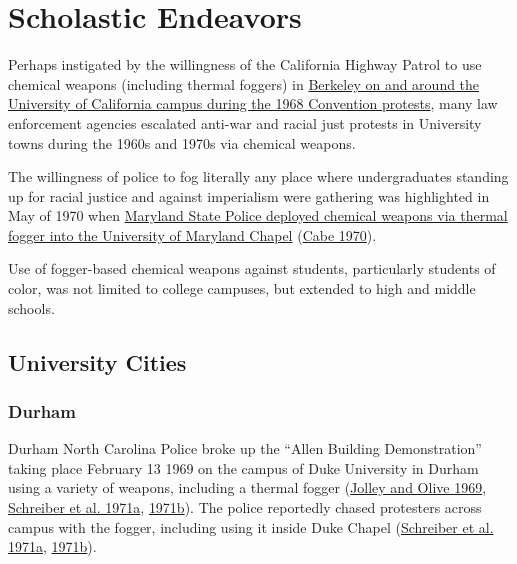 \documentclass[
  11pt,
]{krantz}
\begin{document}
\hypertarget{scholastic-endeavors}{%
\chapter{Scholastic Endeavors}\label{scholastic-endeavors}}

Perhaps instigated by the willingness of the California Highway Patrol to use chemical weapons (including thermal foggers) in \protect\hyperlink{BerkeleyCA1968_08_31}{Berkeley on and around the University of California campus during the 1968 Convention protests}, many law enforcement agencies escalated anti-war and racial just protests in University towns during the 1960s and 1970s via chemical weapons.

The willingness of police to fog literally any place where undergraduates standing up for racial justice and against imperialism were gathering was highlighted in May of 1970 when \protect\hyperlink{CollegeParkMD1970_05_04}{Maryland State Police deployed chemical weapons via thermal fogger into the University of Maryland Chapel} (\protect\hyperlink{ref-Cabe1970}{Cabe 1970}).

Use of fogger-based chemical weapons against students, particularly students of color, was not limited to college campuses, but extended to high and middle schools.

\hypertarget{university-cities}{%
\section{University Cities}\label{university-cities}}

\hypertarget{durham}{%
\subsection{Durham}\label{durham}}

Durham North Carolina Police broke up the ``Allen Building Demonstration'' taking place February 13 1969 on the campus of Duke University in Durham using a variety of weapons, including a thermal fogger (\protect\hyperlink{ref-DMH1969}{Jolley and Olive 1969}, \protect\hyperlink{ref-Schreiberetal1971a}{Schreiber et al. 1971a}, \protect\hyperlink{ref-Schreiberetal1971b}{1971b}).
The police reportedly chased protesters across campus with the fogger, including using it inside Duke Chapel (\protect\hyperlink{ref-Schreiberetal1971a}{Schreiber et al. 1971a}, \protect\hyperlink{ref-Schreiberetal1971b}{1971b}).
\end{document}
